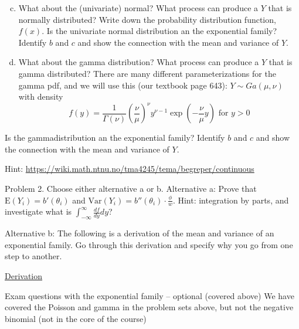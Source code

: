 \documentclass[
  ignorenonframetext,
]{beamer}
\begin{document}
\begin{frame}
\begin{enumerate}
[a)]
\setcounter{enumi}{2}
\item
  What about the (univariate) normal? What process can produce a \(Y\)
  that is normally distributed? Write down the probability distribution
  function, \(f(x)\). Is the univariate normal distribution an the
  exponential family? Identify \(b\) and \(c\) and show the connection
  with the mean and variance of \(Y\).
\item
  What about the gamma distribution? What process can produce a \(Y\)
  that is gamma distributed? There are many different parameterizations
  for the gamma pdf, and we will use this (our textbook page 643):
  \(Y \sim Ga(\mu,\nu)\) with density
  \[ f(y)=\frac{1}{\Gamma(\nu)} (\frac{\nu}{\mu})^{\nu} y^{\nu-1}\exp(-\frac{\nu}{\mu}y) \text{ for }y>0\]
\end{enumerate}

Is the gammadistribution an the exponential family? Identify \(b\) and
\(c\) and show the connection with the mean and variance of \(Y\).

Hint: \url{https://wiki.math.ntnu.no/tma4245/tema/begreper/continuous}
\end{frame}

\begin{frame}
\begin{block}{Problem 2. Choose either alternative a or b.}
\protect\hypertarget{problem-2.-choose-either-alternative-a-or-b.}{}
Alternative a: Prove that \(\text{E}(Y_i)=b'(\theta_i)\) and
\(\text{Var}(Y_i)=b''(\theta_i)\cdot \frac{\phi}{w}\). Hint: integration
by parts, and investigate what is
\(\int_{-\infty}^{\infty} \frac{df}{dy}dy\)?

Alternative b: The following is a derivation of the mean and variance of
an exponential family. Go through this derivation and specify why you go
from one step to another.

\href{https://www.math.ntnu.no/emner/TMA4315/2017h/M5ExpFamProofEVar.pdf}{Derivation}
\end{block}
\end{frame}

\begin{frame}
\begin{block}{Exam questions with the exponential family -- optional
(covered above)}
\protect\hypertarget{exam-questions-with-the-exponential-family-optional-covered-above}{}
We have covered the Poisson and gamma in the problem sets above, but not
the negative binomial (not in the core of the course)
\end{block}
\end{frame}
\end{document}
